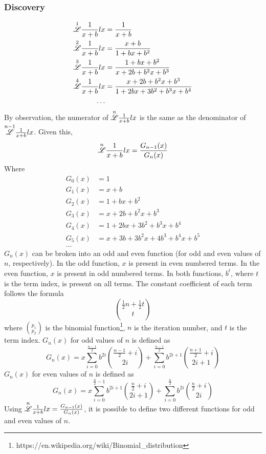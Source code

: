\documentclass[12pt, letterpaper]{article}
\begin{document}
\subsubsection{Discovery}
\begin{equation}
    \begin{split}
        \overset{1}{\mathscr{L}} \frac{1}{x+b} lx & = \frac{1}{x+b}\\
        \overset{2}{\mathscr{L}} \frac{1}{x+b} lx & = \frac{x+b}{1+bx+b^2}\\
        \overset{3}{\mathscr{L}} \frac{1}{x+b} lx & = \frac{1+bx+b^2}{x+2b+b^2x+b^3}\\
        \overset{4}{\mathscr{L}} \frac{1}{x+b} lx & = \frac{x+2b+b^2x+b^3}{1+2bx+3b^2+b^3x+b^4}\\
        \dots
    \end{split}
\end{equation}
By observation, the numerator of $\overset{n}{\mathscr{L}} \frac{1}{x+b} lx$ is the same as the denominator of $\overset{n-1}{\mathscr{L}} \frac{1}{x+b} lx$. Given this,
$$\overset{n}{\mathscr{L}} \frac{1}{x+b} lx = \frac{G_{n-1}(x)}{G_n(x)}$$
Where
\begin{equation}
    \begin{split}
        G_0(x) & = 1\\
        G_1(x) & = x+b\\
        G_2(x) & = 1+bx+b^2\\
        G_3(x) & = x+2b+b^2x+b^3\\
        G_4(x) & = 1+2bx+3b^2+b^3x+b^4\\
        G_5(x) & = x+3b+3b^2x+4b^3+b^4x+b^5\\
        \dots 
    \end{split}
\end{equation}
$G_n(x)$ can be broken into an odd and even function (for odd and even values of $n$, respectively). In the odd function, $x$ is present in even numbered terms. In the even function, $x$ is present in odd numbered terms. In both functions, $b^t$, where $t$ is the term index, is present on all terms. The constant coefficient of each term follows the formula 
$$\binom{\frac{1}{2}n+\frac{1}{2}t}{t}$$
where $\binom{p_1}{p_2}$ is the binomial function\footnote{https://en.wikipedia.org/wiki/Binomial\_distribution}, $n$ is the iteration number, and $t$ is the term index. $G_n(x)$ for odd values of $n$ is defined as
$$G_n(x) = x\sum^\frac{n-1}{2}_{i=0}b^{2i}\binom{\frac{n-1}{2}+i}{2i}+\sum^\frac{n-1}{2}_{i=0}b^{2i+1}\binom{\frac{n+1}{2}+i}{2i+1}$$
$G_n(x)$ for even values of $n$ is defined as
$$G_n(x) = x\sum^{\frac{n}{2}-1}_{i=0}b^{2i+1}\binom{\frac{n}{2}+i}{2i+1}+\sum^\frac{n}{2}_{i=0}b^{2i}\binom{\frac{n}{2}+i}{2i}$$
Using $\overset{n}{\mathscr{L}} \frac{1}{x+b} lx = \frac{G_{n-1}(x)}{G_n(x)}$, it is possible to define two different functions for odd and even values of $n$.
\end{document}
